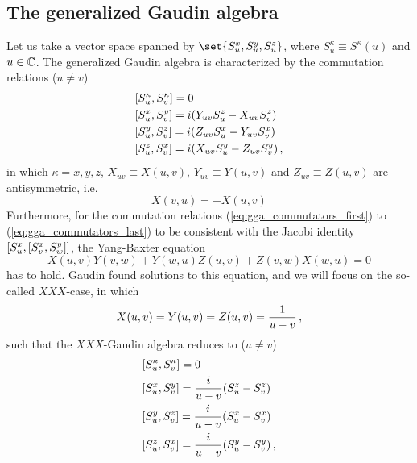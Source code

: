     \subsection{The generalized Gaudin algebra}
        Let us take a vector space spanned by $\set{S^x_u, S^y_u, S^z_u}$, where $S^\kappa_u \equiv S^\kappa(u)$ and $u \in \mathbb{C}$. The generalized Gaudin algebra is characterized by the commutation relations ($u \neq v$)
        \begin{align}
            & \comm{S^\kappa_u}{S^\kappa_v} = 0 \label{eq:gga_commutators_first} \\
            & \comm{S^x_u}{S^y_v} = i \qty( Y_{uv} S^z_u - X_{uv} S^z_v ) \\
            & \comm{S^y_u}{S^z_v} = i \qty( Z_{uv} S^x_u - Y_{uv} S^x_v ) \\
            & \comm{S^z_u}{S^x_v} = i \qty( X_{uv} S^y_u - Z_{uv} S^y_v ) \label{eq:gga_commutators_last} \thinspace ,
        \end{align}
        in which $\kappa=x,y,z$, $X_{uv} \equiv X(u,v)$, $Y_{uv} \equiv Y(u,v)$ and $Z_{uv} \equiv Z(u,v)$ are antisymmetric, i.e.
        \begin{equation}
            X(v, u) = - X(u, v)
        \end{equation}
        Furthermore, for the commutation relations (\ref{eq:gga_commutators_first}) to (\ref{eq:gga_commutators_last}) to be consistent with the Jacobi identity $\comm{S^x_u}{\comm{S^x_v}{S^y_w}}$, the Yang-Baxter equation
        \begin{equation}
            X(u, v) Y(v, w) + Y(w, u) Z(u, v) + Z(v, w) X(w, u) = 0
        \end{equation}
        has to hold. Gaudin \cite{gaudin1976} found solutions to this equation, and we will focus on the so-called $XXX$-case, in which
        \begin{equation}
            X(u, v) = Y(u, v) = Z(u, v) = \frac{1}{u - v} \thinspace ,
        \end{equation}
        such that the $XXX$-Gaudin algebra reduces to ($u \neq v$)
        \begin{align}
            & \comm{S^\kappa_u}{S^\kappa_v} = 0 \\
            & \comm{S^x_u}{S^y_v} = \frac{i}{u-v} \qty(S^z_u - S^z_v) \\
            & \comm{S^y_u}{S^z_v} = \frac{i}{u-v} \qty(S^x_u - S^x_v) \\
            & \comm{S^z_u}{S^x_v} = \frac{i}{u-v} \qty(S^y_u - S^y_v) \thinspace ,
        \end{align}
